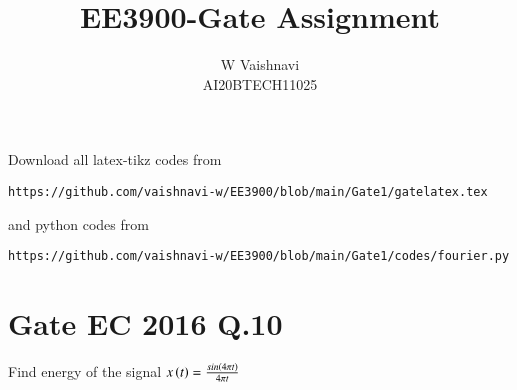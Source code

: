 \documentclass[journal,12pt,twocolumn]{IEEEtran}
\begin{document}
\title{EE3900-Gate Assignment}
\author{W Vaishnavi\\AI20BTECH11025}
\maketitle
\newpage
\bigskip
\renewcommand{\thefigure}{\theenumi}
\renewcommand{\thetable}{\theenumi}
Download all latex-tikz codes from 
%
\begin{lstlisting}
https://github.com/vaishnavi-w/EE3900/blob/main/Gate1/gatelatex.tex
\end{lstlisting}
and python codes from 
%
\begin{lstlisting}
https://github.com/vaishnavi-w/EE3900/blob/main/Gate1/codes/fourier.py
\end{lstlisting}
\section{Gate EC 2016 Q.10}
Find energy of the signal $x\left(t\right) = \frac{sin\left(4\pi t\right)}{4 \pi t}$
\end{document}
